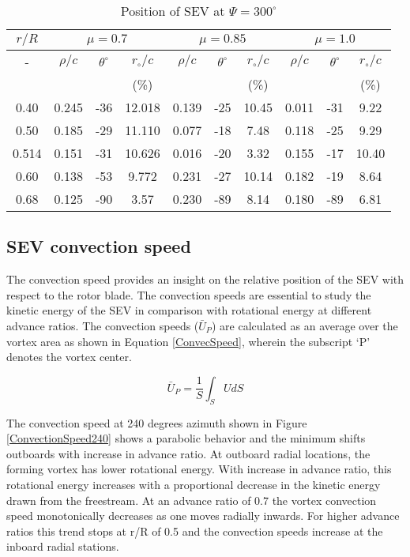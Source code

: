\documentclass[%
 reprint,
 showkeys,
 amsmath,amssymb,
 aps,
]{revtex4-1}
\begin{document}
\begin{table}[!ht]
	\centering
	\caption{Position of SEV at $\Psi = 300^{\circ}$}
	\begin{tabular}{ |c||c|c|c|c|c|c|c|c|c| }
		\hline
		\multicolumn{1}{|c||}{$r/R$} & \multicolumn{3}{c}{$\mu = 0.7$} & \multicolumn{3}{|c}{$\mu = 0.85$} & \multicolumn{3}{|c|}{$\mu = 1.0$} \\
		\hline
		- & $\rho/c$ & ${\theta}^\circ $ & $r_{\circ}/c$ & $\rho/c$ & ${\theta}^\circ $ & $r_{\circ}/c$ & $\rho/c$ & ${\theta}^\circ $ & $r_{\circ}/c$ \\
		 & & & (\%)& & & (\%)& & & (\%)\\
		\hline
		0.40 & 0.245 & -36 & 12.018 & 0.139 & -25	& 10.45 & 0.011 & -31 & 9.22\\
		0.50 & 0.185 & -29  & 11.110 & 0.077 & -18 & 7.48 & 0.118 & -25 & 9.29\\
		0.514& 0.151 & -31  & 10.626 & 0.016 & -20 & 3.32 & 0.155 & -17 & 10.40\\
		0.60 & 0.138 & -53  & 9.772 & 0.231 & -27 & 10.14 & 0.182 & -19 & 8.64\\
		0.68 & 0.125 & -90 & 3.57 & 0.230 & -89& 8.14 & 0.180 &
		-89 & 6.81\\
		\hline
	\end{tabular}
	
	\label{Tab:SevPositionAz300}
\end{table}

\subsection{SEV convection speed}

The convection speed provides an insight on the relative position of the SEV with respect to the rotor blade. The convection speeds are essential to study the kinetic energy of the SEV in comparison with rotational energy at different advance ratios. The convection speeds ($\bar{U}_P$) are calculated as an average over the vortex area as shown in Equation \ref{ConvecSpeed}, wherein the subscript `P' denotes the vortex center.  

\begin{equation}\label{ConvecSpeed}
\bar{U}_P = \frac{1}{S}\int_{S}U dS
\end{equation}


The convection speed at 240 degrees azimuth shown in Figure \ref{ConvectionSpeed240} shows a parabolic behavior and the minimum shifts outboards with increase in advance ratio. At outboard radial locations, the forming vortex has lower rotational energy. With increase in advance ratio, this rotational energy increases with a proportional decrease in the kinetic energy drawn from the freestream. At an advance ratio of 0.7 the vortex convection speed monotonically decreases as one moves radially inwards. For higher advance ratios this trend stops at r/R of 0.5 and the convection speeds increase at the inboard radial stations.  
\end{document}
